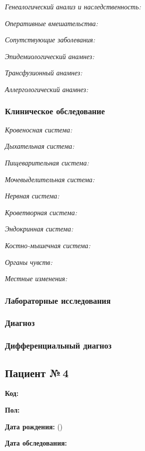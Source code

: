 \documentclass[a4paper,14pt]{extarticle}
\begin{document}
\emph{Генеалогический анализ и наследственность:}

\emph{Оперативные вмешательства:}

\emph{Сопутствующие заболевания:}

\emph{Эпидемиологический анамнез:}

\emph{Трансфузионный анамнез:}

\emph{Аллергологический анамнез:}

\subsubsection*{Клиническое обследование}

\emph{Кровеносная система:}

\emph{Дыхательная система:}

\emph{Пищеварительная система:}

\emph{Мочевыделительная система:}

\emph{Нервная система:} 

\emph{Кроветворная система:}

\emph{Эндокринная система:}

\emph{Костно-мышечная система:}

\emph{Органы чувств:}

\emph{Местные изменения:}

\subsubsection*{Лабораторные исследования}

\subsubsection*{Диагноз}

\subsubsection*{Дифференциальный диагноз}

\newpage
\subsection*{Пациент №\,4}

\textbf{Код:} 

\textbf{Пол:}

\textbf{Дата рождения:}  ()

\textbf{Дата обследования:} 
\end{document}
